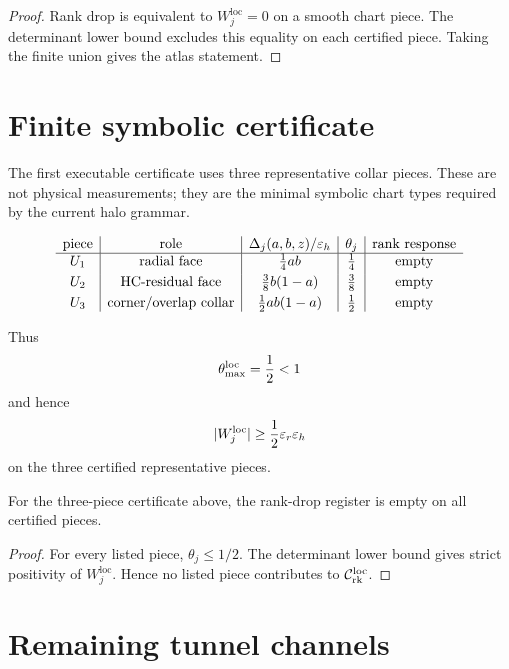\begin{proof}
Rank drop is equivalent to \(W_j^{\mathrm{loc}}=0\) on a smooth chart piece. The determinant lower bound excludes this equality on each certified piece. Taking the finite union gives the atlas statement.
\end{proof}

\section{Finite symbolic certificate}

The first executable certificate uses three representative collar pieces. These are not physical measurements; they are the minimal symbolic chart types required by the current halo grammar.

\[
\begin{array}{c|c|c|c|c}
\text{piece} & \text{role} & \Delta_j(a,b,z)/\varepsilon_h & \theta_j & \text{rank response}\\
\hline
U_1 & \text{radial face} & \frac14 ab & \frac14 & \text{empty}\\[1mm]
U_2 & \text{HC-residual face} & \frac38 b(1-a) & \frac38 & \text{empty}\\[1mm]
U_3 & \text{corner/overlap collar} & \frac12 ab(1-a) & \frac12 & \text{empty}
\end{array}
\]

Thus
\[
\theta_{\max}^{\mathrm{loc}}=\frac12<1
\]
and hence
\[
|W_j^{\mathrm{loc}}|\ge \frac12\varepsilon_r\varepsilon_h
\]
on the three certified representative pieces.

\begin{lemma}
For the three-piece certificate above, the rank-drop register is empty on all certified pieces.
\end{lemma}

\begin{proof}
For every listed piece, \(\theta_j\le 1/2\). The determinant lower bound gives strict positivity of \(W_j^{\mathrm{loc}}\). Hence no listed piece contributes to \(\mathcal C_{\mathrm{rk}}^{\mathrm{loc}}\).
\end{proof}

\section{Remaining tunnel channels}

